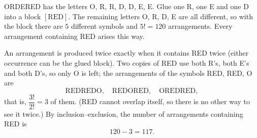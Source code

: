 ORDERED has the letters O, R, R, D, D, E, E. Glue one R, one E and one D into a block $[\mathrm{RED}]$. The remaining letters O, R, D, E are all different, so with the block there are $5$ different symbols and $5!=120$ arrangements. Every arrangement containing RED arises this way.

An arrangement is produced twice exactly when it contains RED twice (either occurrence can be the glued block). Two copies of RED use both R's, both E's and both D's, so only O is left; the arrangements of the symbols RED, RED, O are
\[
\mathrm{REDREDO},\quad \mathrm{REDORED},\quad \mathrm{OREDRED},
\]
that is, $\dfrac{3!}{2!}=3$ of them. (RED cannot overlap itself, so there is no other way to see it twice.) By inclusion--exclusion, the number of arrangements containing RED is
\[
120-3=\boxed{117}.
\]
